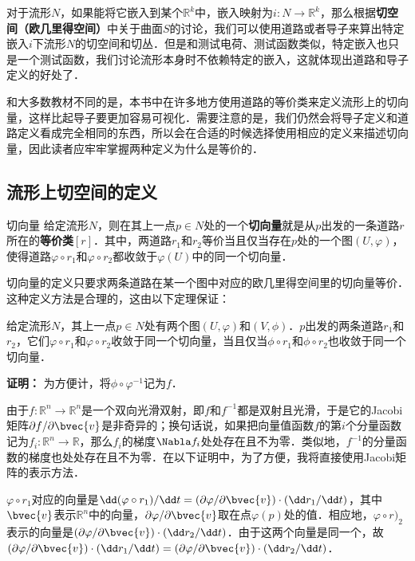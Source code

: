 
对于流形$N$，如果能将它嵌入到某个$\mathbb{R}^k$中，嵌入映射为$i:N\rightarrow\mathbb{R}^k$，那么根据\textbf{切空间（欧几里得空间）}中关于曲面$S$的讨论，我们可以使用道路或者导子来算出特定嵌入$i$下流形$N$的切空间和切丛．但是和测试电荷、测试函数类似，特定嵌入也只是一个测试函数，我们讨论流形本身时不依赖特定的嵌入，这就体现出道路和导子定义的好处了．

和大多数教材不同的是，本书中在许多地方使用道路的等价类来定义流形上的切向量，这样比起导子要更加容易可视化．需要注意的是，我们仍然会将导子定义和道路定义看成完全相同的东西，所以会在合适的时候选择使用相应的定义来描述切向量，因此读者应牢牢掌握两种定义为什么是等价的．

\subsection{流形上切空间的定义}

\begin{definition}{切向量}
给定流形$N$，则在其上一点$p\in N$处的一个\textbf{切向量}就是从$p$出发的一条道路$r$所在的\textbf{等价类}$[r]$．其中，两道路$r_1$和$r_2$等价当且仅当存在$p$处的一个图$(U, \varphi)$，使得道路$\varphi\circ r_1$和$\varphi\circ r_2$都收敛于$\varphi(U)$中的同一个切向量．
\end{definition}

切向量的定义只要求两条道路在某一个图中对应的欧几里得空间里的切向量等价．这种定义方法是合理的，这由以下定理保证：

\begin{theorem}{}\label{tgSpa_the1}
给定流形$N$，其上一点$p\in N$处有两个图$(U, \varphi)$和$(V, \phi)$．$p$出发的两条道路$r_1$和$r_2$，它们$\varphi\circ r_1$和$\varphi\circ r_2$收敛于同一个切向量，当且仅当$\phi\circ r_1$和$\phi\circ r_2$也收敛于同一个切向量．
\end{theorem}

\textbf{证明：}
为方便计，将$\phi\circ\varphi^{-1}$记为$f$．

由于$f:\mathbb{R}^n\rightarrow\mathbb{R}^n$是一个双向光滑双射，即$f$和$f^{-1}$都是双射且光滑，于是它的Jacobi矩阵$\partial f/\partial \bvec{v}$是非奇异的；换句话说，如果把向量值函数$f$的第$i$个分量函数记为$f_i:\mathbb{R}^n\rightarrow\mathbb{R}$，那么$f_i$的梯度$\Nabla f_i$处处存在且不为零．类似地，$f^{-1}$的分量函数的梯度也处处存在且不为零．在以下证明中，为了方便，我将直接使用Jacobi矩阵的表示方法．

$\varphi\circ r_1$对应的向量是$\dd(\varphi\circ r_1)/\dd t=(\partial\varphi/\partial\bvec{v})\cdot(\dd r_1/\dd t)$，其中$\bvec{v}$表示$\mathbb{R}^n$中的向量，$\partial\varphi/\partial\bvec{v}$取在点$\varphi(p)$处的值．相应地，$\varphi\circ r)_2$表示的向量是$(\partial\varphi/\partial\bvec{v})\cdot(\dd r_2/\dd t)$．由于这两个向量是同一个，故$(\partial\varphi/\partial\bvec{v})\cdot(\dd r_1/\dd t)=(\partial\varphi/\partial\bvec{v})\cdot(\dd r_2/\dd t)$．

